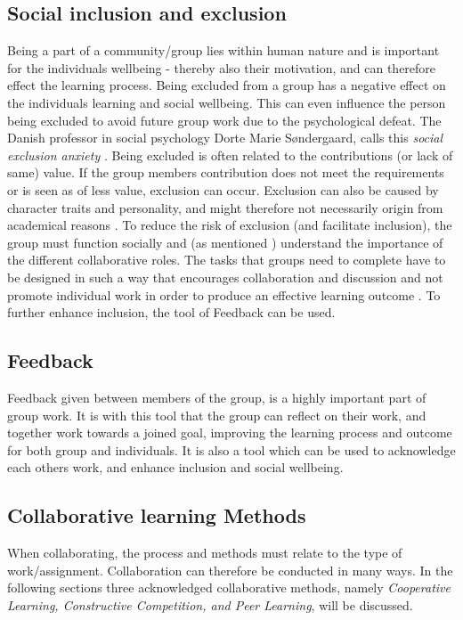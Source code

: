\subsection{Social inclusion and exclusion}
Being a part of a community/group lies within human nature and is important for the individuals wellbeing  \cite{ProjektarbejdesKompleksitet}- thereby also their motivation, and can therefore effect the learning process. Being excluded from a group has a negative effect on the individuals learning and social wellbeing. This can even influence the person being excluded to avoid future group work due to the psychological defeat. The Danish professor in social psychology Dorte Marie Søndergaard, calls this \textit{social exclusion anxiety} \cite{ProjektarbejdesKompleksitet}. Being excluded is often related to the contributions (or lack of same) value. If the group members contribution does not meet the requirements or is seen as of less value, exclusion can occur. Exclusion can also be caused by character traits and personality, and might therefore not necessarily origin from academical reasons \cite{ProjektarbejdesKompleksitet}.
To reduce the risk of exclusion (and facilitate inclusion), the group must function socially and (as mentioned ) understand the importance of the different collaborative roles. The tasks that groups need to complete have to be designed in such a way that encourages collaboration and discussion and not promote individual work in order to produce an effective learning outcome \cite{collaborationSocialPedagogy}. To further enhance inclusion, the tool of Feedback can be used. 


\subsection{Feedback}
Feedback given between members of the group, is a highly important part of group work\cite{laeringIPraksis}\cite{ProjektarbejdesKompleksitet}. It is with this tool that the group can reflect on their work, and together work towards a joined goal, improving the learning process and outcome for both group and individuals\cite{laeringIPraksis}\cite{ProjektarbejdesKompleksitet}. It is also a tool which can be used to acknowledge each others work, and enhance inclusion and social wellbeing\cite{laeringIPraksis}\cite{ProjektarbejdesKompleksitet}. 


\subsection{Collaborative learning Methods} 
When collaborating, the process and methods must relate to the type of work/assignment. Collaboration can therefore be conducted in many ways. In the following sections three acknowledged collaborative methods, namely \textit{Cooperative Learning, Constructive Competition, and Peer Learning}, will be discussed.  

